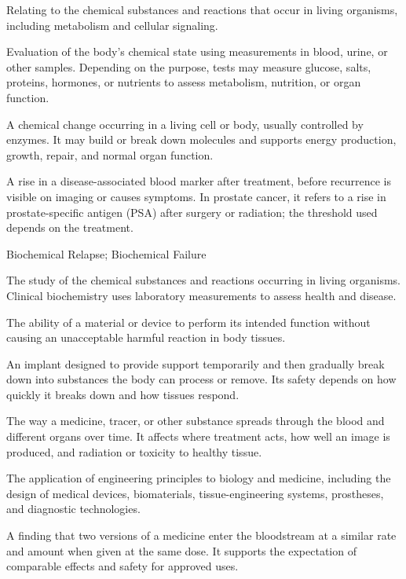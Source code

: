  Relating to the chemical substances and reactions that occur in living organisms, including metabolism and cellular signaling.

 Evaluation of the body's chemical state using measurements in blood, urine, or other samples. Depending on the purpose, tests may measure glucose, salts, proteins, hormones, or nutrients to assess metabolism, nutrition, or organ function.

 A chemical change occurring in a living cell or body, usually controlled by enzymes. It may build or break down molecules and supports energy production, growth, repair, and normal organ function.

 A rise in a disease-associated blood marker after treatment, before recurrence is visible on imaging or causes symptoms. In prostate cancer, it refers to a rise in prostate-specific antigen (PSA) after surgery or radiation; the threshold used depends on the treatment.

\synonyms
Biochemical Relapse; Biochemical Failure

 The study of the chemical substances and reactions occurring in living organisms. Clinical biochemistry uses laboratory measurements to assess health and disease.

 The ability of a material or device to perform its intended function without causing an unacceptable harmful reaction in body tissues.

 An implant designed to provide support temporarily and then gradually break down into substances the body can process or remove. Its safety depends on how quickly it breaks down and how tissues respond.

 The way a medicine, tracer, or other substance spreads through the blood and different organs over time. It affects where treatment acts, how well an image is produced, and radiation or toxicity to healthy tissue.

 The application of engineering principles to biology and medicine, including the design of medical devices, biomaterials, tissue-engineering systems, prostheses, and diagnostic technologies.

 A finding that two versions of a medicine enter the bloodstream at a similar rate and amount when given at the same dose. It supports the expectation of comparable effects and safety for approved uses.

